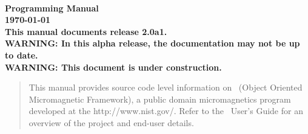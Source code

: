 
\usepackage{l2hbugs}




\nocite{*}  %


\begin{titlepage}
\label{page:contents}
\par
\vspace*{\fill}
\begin{center}
\Large\bf
\OOMMF\\
Programming Manual\\[2ex]
\large
{\today}
{}\\[2ex]
This manual documents release 2.0a1.\\[1ex]
WARNING: In this alpha release, the
documentation may not be up to date.\\[1ex]
WARNING: This document is under construction.

\end{center}
\vspace{10\baselineskip}
\begin{abstract}
This manual provides source code level information on \OOMMF\ (Object Oriented Micromagnetic Framework),
a public domain micromagnetics program developed at the
{http://www.nist.gov/}.  Refer to the \OOMMF\ User's Guide for an
overview of the project and end-user details.
\end{abstract}
\vspace*{\fill}
\par
\end{titlepage}

\begin{latexonly}
\tableofcontents
\end{latexonly}


\newpage

\newpage







%
%






\printindex


